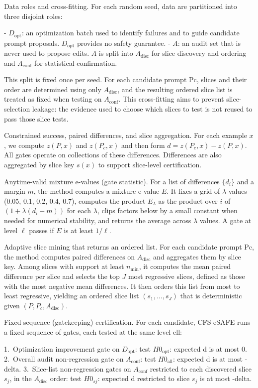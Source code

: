\documentclass{article} %
\begin{document}
Data roles and cross-fitting. For each random seed, data are partitioned into three disjoint roles:

- $D_{\text{opt}}$: an optimization batch used to identify failures and to guide candidate prompt proposals. $D_{\text{opt}}$ provides no safety guarantee.
- $A$: an audit set that is never used to propose edits. $A$ is split into $A_{\text{disc}}$ for slice discovery and ordering and $A_{\text{conf}}$ for statistical confirmation.

This split is fixed once per seed. For each candidate prompt Pc, slices and their order are determined using only $A_{\text{disc}}$, and the resulting ordered slice list is treated as fixed when testing on $A_{\text{conf}}$. This cross-fitting aims to prevent slice-selection leakage: the evidence used to choose which slices to test is not reused to pass those slice tests.

Constrained success, paired differences, and slice aggregation. For each example $x$, we compute $z(P, x)$ and $z(P_c, x)$ and then form $d = z(P_c, x) - z(P, x)$. All gates operate on collections of these differences. Differences are also aggregated by slice key $s(x)$ to support slice-level certification.

Anytime-valid mixture e-values (gate statistic). For a list of differences $\{d_i\}$ and a margin $m$, the method computes a mixture e-value $E$. It fixes a grid of $\lambda$ values (0.05, 0.1, 0.2, 0.4, 0.7), computes the product $E_{\lambda}$ as the product over $i$ of $(1 + \lambda (d_i - m))$ for each $\lambda$, clips factors below by a small constant when needed for numerical stability, and returns the average across $\lambda$ values. A gate at level $\ell$ passes if $E$ is at least $1/\ell$.

Adaptive slice mining that returns an ordered list. For each candidate prompt Pc, the method computes paired differences on $A_{\text{disc}}$ and aggregates them by slice key. Among slices with support at least $n_{\min}$, it computes the mean paired difference per slice and selects the top $J$ most regressive slices, defined as those with the most negative mean differences. It then orders this list from most to least regressive, yielding an ordered slice list $(s_1, \ldots, s_J)$ that is deterministic given $(P, P_c, A_{\text{disc}})$.

Fixed-sequence (gatekeeping) certification. For each candidate, CFS-eSAFE runs a fixed sequence of gates, each tested at the same level ell:

1.~Optimization improvement gate on $D_{\text{opt}}$: test $H0_{\text{opt}}$: expected d is at most 0.
2.~Overall audit non-regression gate on $A_{\text{conf}}$: test $H0_{\text{all}}$: expected d is at most -delta.
3.~Slice-list non-regression gates on $A_{\text{conf}}$ restricted to each discovered slice $s_j$, in the $A_{\text{disc}}$ order: test $H0_{sj}$: expected d restricted to slice $s_j$ is at most -delta.
\end{document}
